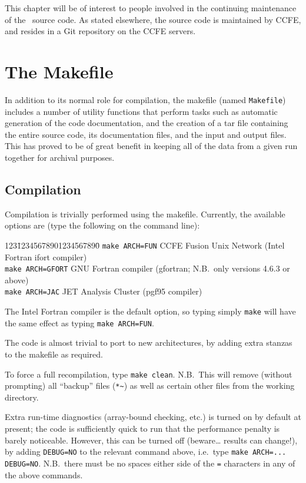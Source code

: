 \label{chap:codetools}

This chapter will be of interest to people involved in the continuing
maintenance of the \process\ source code. As stated elsewhere, the source code
is maintained by CCFE, and resides in a Git repository on the CCFE servers.

\section{The Makefile}
\label{sec:makefile}

In addition to its normal role for compilation, the makefile (named
\texttt{Makefile}) includes a number of utility functions that perform tasks
such as automatic generation of the code documentation, and the creation of a
tar file containing the entire source code, its documentation files, and the
input and output files. This has proved to be of great benefit in keeping all
of the data from a given run together for archival purposes.

\subsection{Compilation}

Compilation is trivially performed using the makefile. Currently, the
available options are (type the following on the command line):
\begin{tabbing}
123\=12345678901234567890\= \kill
\> \texttt{make ARCH=FUN} \> CCFE Fusion Unix Network (Intel Fortran ifort compiler) \\
\> \texttt{make ARCH=GFORT} \> GNU Fortran compiler (gfortran; N.B.\ only versions
4.6.3 or above) \\
\> \texttt{make ARCH=JAC} \> JET Analysis Cluster (pgf95 compiler)
\end{tabbing}
The Intel Fortran compiler is the default option, so typing simply
\texttt{make} will have the same effect as typing \texttt{make ARCH=FUN}.

The code is almost trivial to port to new architectures, by adding extra
stanzas to the makefile as required.

To force a full recompilation, type \texttt{make clean}. N.B.\ This will
remove (without prompting) all ``backup'' files (\texttt{*\~}) as well as
certain other files from the working directory.

Extra run-time diagnostics (array-bound checking, etc.) is turned on by
default at present; the code is sufficiently quick to run that the performance
penalty is barely noticeable. However, this can be turned off (beware\ldots
results can change!), by adding \texttt{DEBUG=NO} to the relevant command
above, i.e.\ type \verb+make ARCH=... DEBUG=NO+.  N.B.\ there must be no
spaces either side of the \texttt{=} characters in any of the above commands.

